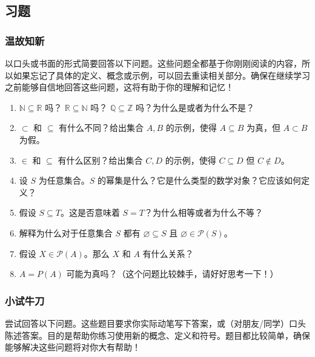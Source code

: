 \subsection{习题}

\subsubsection*{温故知新}

以口头或书面的形式简要回答以下问题。这些问题全都基于你刚刚阅读的内容，所以如果忘记了具体的定义、概念或示例，可以回去重读相关部分。确保在继续学习之前能够自信地回答这些问题，这将有助于你的理解和记忆！

\begin{enumerate}[label=(\arabic*)]
    \item $\mathbb{N} \subseteq \mathbb{R}$ 吗？ $\mathbb{R} \subseteq \mathbb{N}$ 吗？ $\mathbb{Q} \subseteq \mathbb{Z}$ 吗？为什么是或者为什么不是？
    \item $\subset$ 和 $\subseteq$ 有什么不同？给出集合 $A, B$ 的示例，使得 $A \subseteq B$ 为真，但 $A \subset B$ 为假。
    \item $\in$ 和 $\subseteq$ 有什么区别？给出集合 $C, D$ 的示例，使得 $C \subseteq D$ 但 $C \notin D$。
    \item 设 $S$ 为任意集合。$S$ 的幂集是什么？它是什么类型的数学对象？它应该如何定义？
    \item 假设 $S \subseteq T$。这是否意味着 $S = T$？为什么相等或者为什么不等？
    \item 解释为什么对于任意集合 $S$ 都有 $\varnothing \subseteq S$ 且 $\varnothing \in \mathcal{P}(S)$。
    \item 假设 $X \in \mathcal{P}(A)$。那么 $X$ 和 $A$ 有什么关系？
    \item $A = P(A)$ 可能为真吗？（这个问题比较棘手，请好好思考一下！）
\end{enumerate}

\subsubsection*{小试牛刀}

尝试回答以下问题。这些题目要求你实际动笔写下答案，或（对朋友/同学）口头陈述答案。目的是帮助你练习使用新的概念、定义和符号。题目都比较简单，确保能够解决这些问题将对你大有帮助！

